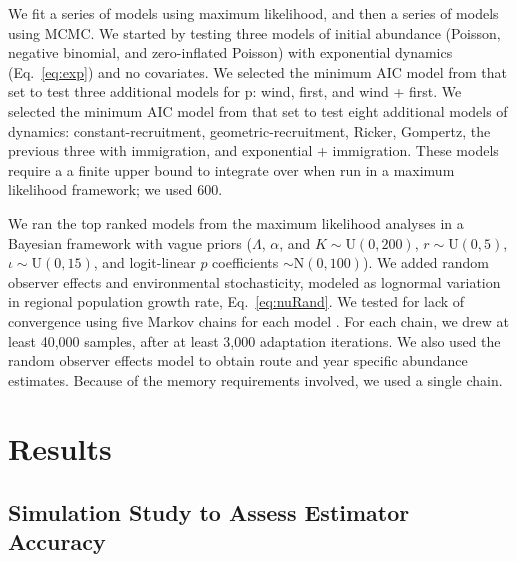 \documentclass[12pt,english]{article}
\begin{document}
\begin{spacing}{1.9}
\begin{flushleft}
We fit a series of models using maximum likelihood, 
and then a series of models using MCMC. We started by testing
three models of initial abundance (Poisson, negative binomial, and
zero-inflated Poisson) with exponential dynamics
(Eq.~\ref{eq:exp}) and no covariates.  We selected the minimum AIC model from that set to test three additional
models for p: wind, first, and wind + first. We selected the minimum
AIC model from that set to test eight additional models of dynamics:
constant-recruitment, geometric-recruitment, Ricker, Gompertz, 
the previous three with immigration, and exponential + immigration.
These models require a a finite upper bound to integrate
over when run in a maximum likelihood
framework; we used 600. 

We ran the top ranked models from the maximum likelihood
analyses in a Bayesian framework with vague  
priors ($\Lambda$,
$\alpha$, and $K  \sim \mathrm{U}(0, 200)$, $r  \sim \mathrm{U}(0, 5)$,
$\iota  \sim \mathrm{U}(0, 15)$, and logit-linear $p$ coefficients $\sim \mathrm{N}(0, 100)$).  
We added random observer 
effects and environmental stochasticity, modeled as lognormal
variation in regional population growth rate, Eq.~\ref{eq:nuRand}.
We tested for lack of convergence using
five Markov chains for each model \citep{gelman_rubin:1992}.
For each chain, we drew at least 40,000 samples, 
after at least 3,000 adaptation iterations.   
We also used the random observer effects model to obtain route and 
year specific abundance estimates.  Because of the memory requirements involved,
we used a single chain.  

\section*{Results}

\subsection*{Simulation Study to Assess Estimator Accuracy}


\end{flushleft}
\end{spacing}
\end{document}
